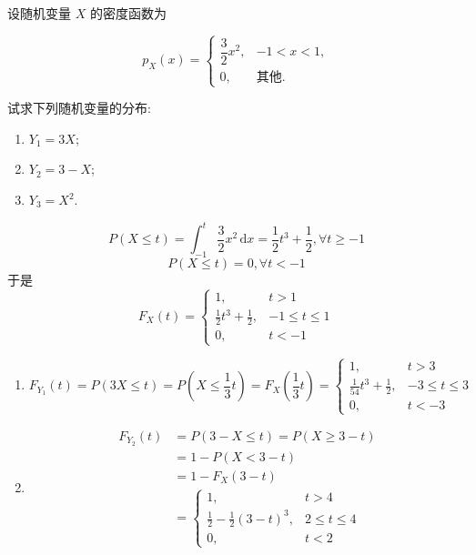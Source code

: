\documentclass[../main.tex]{subfiles}
\begin{document}
\begin{exercise}{}{}
设随机变量 $X$ 的密度函数为

\[
p_X(x) = \begin{cases}
\dfrac{3}{2}x^2, & -1 < x < 1, \\
0, & \text{其他}.
\end{cases}
\]

试求下列随机变量的分布:

\begin{enumerate}
    \item[(1)] $Y_1 = 3X$;
    \item[(2)] $Y_2 = 3 - X$;
    \item[(3)] $Y_3 = X^2$.
\end{enumerate}
\end{exercise}
\begin{solution}
  \[
    P\left( X\le t \right)= \int_{-1}^{t}\frac{3 }{2 }x^{2}\,\mathrm{d} x = \frac{1 }{2 }t^{3}+ \frac{1 }{2 }  ,\forall t\ge -1  
    \] \[
    P\left( X\le t \right)= 0, \forall t< -1 
    \]于是 \[
    F_{X}\left( t \right)= \begin{cases} 1,& t> 1\\ 
     \frac{1 }{2 }t^{3}+ \frac{1 }{2 }, &-1\le t\le 1\\ 
     0,&t< -1   \end{cases}  
    \]
  \begin{enumerate}
    \item  \[
    F_{Y_1}\left( t \right)= P\left( 3X\le t \right)= P\left( X\le \frac{1 }{3 }t  \right)= F_{X}\left( \frac{1 }{3 }t  \right)= \begin{cases} 1,&t> 3\\ 
     \frac{1 }{54 }t^{3}+ \frac{1 }{2 }, &-3\le t\le 3\\ 
     0,&t< -3    \end{cases}     
    \]
    \item \[
    \begin{aligned}
    F_{Y_2}\left( t \right)&= P\left( 3-X\le t \right)= P\left( X\ge 3-t \right)\\ 
     &= 1-P\left( X< 3-t \right)\\ 
      &= 1-F_{X}\left( 3-t \right)\\ 
       &= \begin{cases} 1,&t>  4\\ 
        \frac{1 }{2 } -\frac{1 }{2 }\left( 3-t \right)^{3}, & 2\le t\le 4  \\ 
         0,&t< 2  \end{cases}    

\end{aligned}\]
\end{enumerate}
\end{solution}
\end{document}
